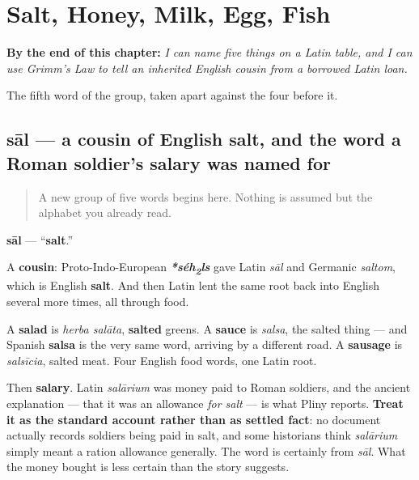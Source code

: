 
\chapter{Salt, Honey, Milk, Egg, Fish}
\label{ch:la-mensa}

\begin{chapteropening}
\textbf{By the end of this chapter:} \emph{I can name five things on a Latin table, and I can use Grimm's Law to tell an inherited English cousin from a borrowed Latin loan.}

The fifth word of the group, taken apart against the four before it.
\end{chapteropening}

\section[sāl, salis]{sāl — a cousin of English salt, and the word a Roman soldier's salary was named for}

\label{lesson:LA-C47-sal}



\begin{quote}
A new group of five words begins here. Nothing is assumed but the alphabet you already read.
\end{quote}

\begin{cousinweb}
\textbf{sāl} — \textquotedblleft{}\textbf{salt}.\textquotedblright{}

A \textbf{cousin}: Proto-Indo-European \emph{\textbf{*séh\textsubscript{2}ls}} gave Latin \emph{sāl} and Germanic \emph{saltom}, which is English \textbf{salt}. And then Latin lent the same root back into English several more times, all through food.

A \textbf{salad} is \emph{herba salāta}, \textbf{salted} greens. A \textbf{sauce} is \emph{salsa}, the salted thing — and Spanish \textbf{salsa} is the very same word, arriving by a different road. A \textbf{sausage} is \emph{salsīcia}, salted meat. Four English food words, one Latin root.

Then \textbf{salary}. Latin \emph{salārium} was money paid to Roman soldiers, and the ancient explanation — that it was an allowance \emph{for salt} — is what Pliny reports. \textbf{Treat it as the standard account rather than as settled fact}: no document actually records soldiers being paid in salt, and some historians think \emph{salārium} simply meant a ration allowance generally. The word is certainly from \emph{sāl}. What the money bought is less certain than the story suggests.
\end{cousinweb}

